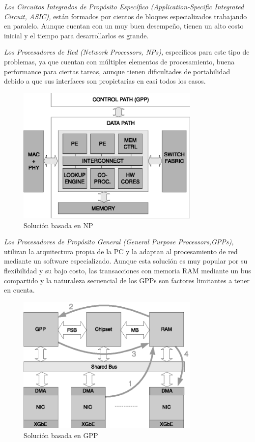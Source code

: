 \emph{Los Circuitos Integrados de Propósito Específico (\textit{Application-Specific Integrated Circuit}, ASIC),} están formados por cientos de bloques especializados trabajando en paralelo. Aunque cuentan con un muy buen desempeño, tienen un alto costo inicial y el tiempo para desarrollarlos es grande.

\emph{Los Procesadores de Red (Network Processors, NPs),} específicos para este tipo de problemas, ya que cuentan con múltiples elementos de procesamiento, buena performance para ciertas tareas, aunque tienen dificultades de portabilidad debido a que sus interfaces son propietarias en casi todos los casos.
\begin{figure}[h]
  \centering
      \includegraphics[width=0.8\textwidth]{1-introduccion/graf/NP_based.eps}
  \caption{Solución basada en NP}
  \label{fig:diseno}
\end{figure}
\newpage

\emph{Los Procesadores de Propósito General (General Purpose Processors,GPPs),} utilizan la arquitectura propia de la PC y la adaptan al procesamiento de red mediante un software especializado. Aunque esta solución es muy popular por su flexibilidad y su bajo costo, las transacciones con memoria RAM mediante un bus compartido y la naturaleza secuencial de los GPPs son factores limitantes a tener en cuenta. 
 \begin{figure}[h]
  \centering
      \includegraphics[width=0.8\textwidth]{1-introduccion/graf/GPP_based.eps}
  \caption{Solución basada en GPP}
  \label{fig:diseno}
\end{figure}

